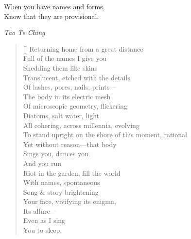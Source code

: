 \epigraph{When you have names and forms,\\ Know that they are provisional.}{\textit{Tao Te Ching}}

\label{ch:child}
\settowidth{\versewidth}{To stand upright on the shore of this moment, rational}
\begin{verse}[\versewidth]
Returning home from a great distance\\
Full of the names I give you\\
Shedding them like skins\\
Translucent, etched with the details\\
Of lashes, pores, nails, prints---\\
The body in its electric mesh\\
Of microscopic geometry, flickering\\
Diatoms, salt water, light\\
All cohering, across millennia, evolving\\
To stand upright on the shore of this moment, rational\\
Yet without reason---that body\\
Sings you, dances you.\\
\hfill And you run\\
Riot in the garden, fill the world\\
With names, spontaneous\\
Song \& story brightening \\
Your face, vivifying its enigma,\\
Its allure---\\
\hfill Even as I sing\\
You to sleep.
\end{verse}
